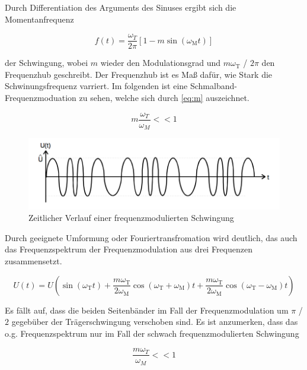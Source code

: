 \noindent Durch Differentiation des Arguments des Sinuses ergibt sich die Momentanfrequenz

\begin{equation}
f(t) = \frac{\omega_T}{2\pi}\left[1-m\sin(\omega_\text{M} t)\right]
\label{eq:momFreq}
\end{equation}

\noindent der Schwingung, wobei $m$ wieder den Modulationsgrad und $m\omega_\text{T}$ / $2\pi$ den Frequenzhub geschreibt. Der Frequenzhub ist es Maß dafür, wie Stark die Schwinungsfrequenz varriert. Im folgenden ist eine Schmalband-Frequenzmoduation zu sehen, welche sich durch \ref{eq:m} auszeichnet.

\begin{equation}
m\frac{\omega_T}{\omega_M} << 1
\label{eq:m}
\end{equation}


\begin{figure}
	\centering
	\includegraphics[width=\textwidth]{img/Abb3.png}
	\caption{Zeitlicher Verlauf einer frequenzmodulierten Schwingung \cite{FP}}
\end{figure}

Durch geeignete Umformung oder Fouriertransfromation wird deutlich, das auch das Frequenzspektrum der Frequenzmodulation aus drei Frequenzen zusammensetzt.

\begin{equation}
U(t) = U \left( \sin( \omega_\text{T} t) + \frac{m\omega_\text{T}}{2\omega_\text{M}}\cos(\omega_\text{T} + \omega_\text{M}) t + \frac{m \omega_\text{T}}{2\omega_\text{M}} \cos( \omega_\text{T} - \omega_\text{M} ) t\right)
\label{eq:FreqFreqMod}
\end{equation}

\noindent Es fällt auf, dass die beiden Seitenbänder im Fall der Frequenzmodulation um $\pi$ / $2$ gegebüber der Trägerschwingung verschoben sind. Es ist anzumerken, dass das o.g. Frequenzspektrum nur im Fall der schwach frequenzmodulierten Schwingung

\begin{equation}
\frac{m\omega_T}{\omega_M} << 1
\end{equation}

